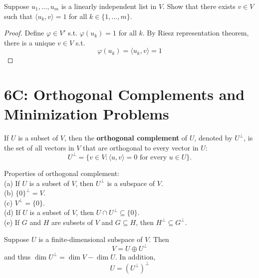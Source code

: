 \documentclass{extarticle}
\begin{document}
\begin{problem}{18}
    Suppose \(u_1, \ldots, u_m\) is a linearly independent list in \(V\). Show that there exists \(v \in V\)
    such that \(\langle u_k,v \rangle = 1\) for all \(k \in \{1, \ldots, m\}\).
\end{problem}

\begin{proof}
Define \(\varphi \in V'\) s.t. \(\varphi(u_k) = 1\) for all \(k\). By Riesz representation theorem,
there is a unique \(v \in V\) s.t.
\[\varphi(u_k) = \langle u_k, v \rangle = 1\]
\end{proof}


\newpage
\section*{6C: Orthogonal Complements and Minimization Problems}

\begin{definition}
    If \(U\) is a subset of \(V\), then the \textbf{orthogonal complement} of \(U\), denoted by
    \(U^\perp\), is the set of all vectors in \(V\) that are orthogonal to every vector in \(U\):
    \[U^\perp = \{v \in V \colon \langle u,v \rangle = 0 \text{ for every } u \in U\}.\]
\end{definition}

\begin{corollary}
    Properties of orthogonal complement: \\
    (a) If \(U\) is a subset of \(V\), then \(U^\perp\) is a subspace of \(V\). \\
    (b) \(\{0\}^\perp = V\). \\
    (c) \(V^\perp = \{0\}\). \\
    (d) If \(U\) is a subset of \(V\), then \(U \cap U^\perp \subseteq \{0\}\). \\
    (e) If \(G\) and \(H\) are subsets of \(V\) and \(G \subseteq H\), then \(H^\perp \subseteq G^\perp\).
\end{corollary}

\begin{corollary}
    Suppose \(U\) is a finite-dimensional subspace of \(V\). Then
    \[V = U \oplus U^\perp\]
    and thus \(\dim U^\perp = \dim V - \dim U\). In addition,
    \[U = (U^\perp)^\perp\]
\end{corollary}
\end{document}
